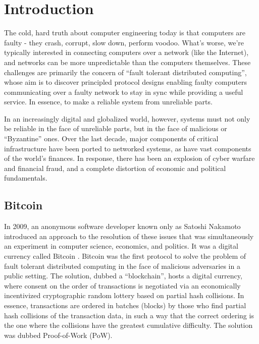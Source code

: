 \chapter{Introduction}
\label{ch:intro}

The cold, hard truth about computer engineering today is that computers are faulty - 
they crash, corrupt, slow down, perform voodoo. 
What's worse, we're typically interested in connecting computers over a network (like the Internet),
and networks can be more unpredictable than the computers themselves.
These challenges are primarily the concern of ``fault tolerant distributed computing'',
whose aim is to discover principled protocol designs enabling faulty computers communicating over a faulty network 
to stay in sync while providing a useful service.
In essence, to make a reliable system from unreliable parts.

In an increasingly digital and globalized world, however, 
systems must not only be reliable in the face of unreliable parts, but in the face of malicious or ``Byzantine'' ones.
Over the last decade, major components of critical infrastructure have been ported to networked systems,
as have vast components of the world's finances.
In response, there has been an explosion of cyber warfare and financial fraud,
and a complete distortion of economic and political fundamentals.

\section{Bitcoin}

In 2009, an anonymous software developer known only as Satoshi Nakamoto introduced an approach to the resolution of these issues 
that was simultaneously an experiment in computer science, economics, and politics. 
It was a digital currency called Bitcoin \cite{bitcoin}.
Bitcoin was the first protocol to solve the problem of fault tolerant distributed computing in the face of malicious adversaries in a public setting.
The solution, dubbed a ``blockchain'', hosts a digital currency, 
where consent on the order of transactions is negotiated via an economically incentivized cryptographic random lottery based on partial hash collisions.
In essence, transactions are ordered in batches (blocks) by those who find partial hash collisions of the transaction data, 
in such a way that the correct ordering is the one where the collisions have the greatest cumulative difficulty.
The solution was dubbed Proof-of-Work (PoW).

